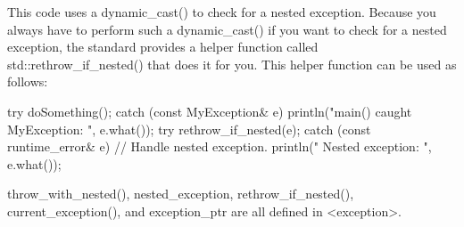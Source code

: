 This code uses a dynamic\_cast() to check for a nested exception. Because you always have to perform such a dynamic\_cast() if you want to check for a nested exception, the standard provides a helper function called std::rethrow\_if\_nested() that does it for you. This helper function can be used as follows:

\begin{cpp}
try {
    doSomething();
} catch (const MyException& e) {
    println("main() caught MyException: {}", e.what());
    try {
        rethrow_if_nested(e);
    } catch (const runtime_error& e) {
        // Handle nested exception.
        println(" Nested exception: {}", e.what());
    }
}
\end{cpp}

throw\_with\_nested(), nested\_exception, rethrow\_if\_nested(), current\_exception(), and exception\_ptr are all defined in <exception>.







